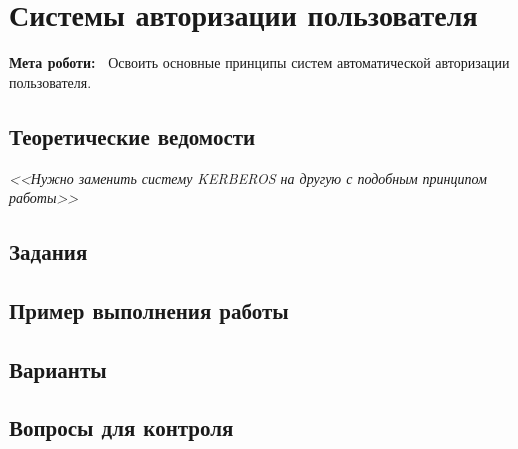 \chapter{Системы авторизации пользователя} \label{chapt5}%
\textbf{Мета роботи:~}%
Освоить основные принципы систем автоматической авторизации пользователя.
\section{Теоретические ведомости} \label{sect5_a}

\textit{<<Нужно заменить систему KERBEROS на другую с подобным принципом
работы>>}

\section{Задания}\label{sect5_b}
%
\section{Пример выполнения работы}\label{sect5_c}
%
\section{Варианты}\label{sect5_d}
%
\section{Вопросы для контроля}\label{sect5_e}
%
